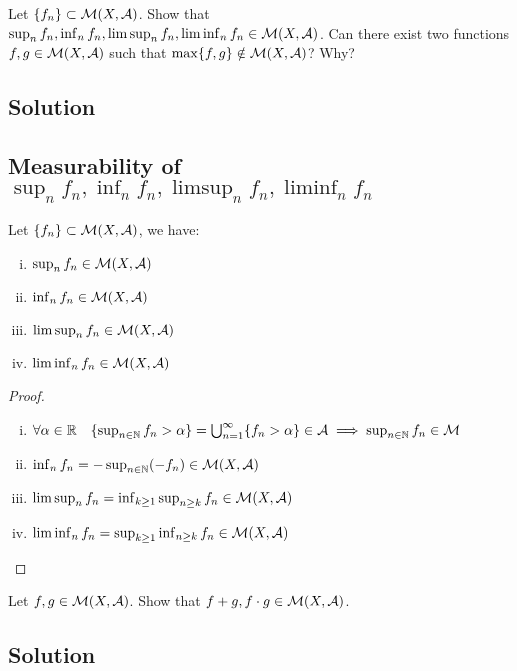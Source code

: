 
\question

Let $\{f_n\} \subset \mathcal{M}(X, \mathcal{A})$. Show that $\sup_n f_n, \inf_n f_n, \limsup_n f_n, \liminf_n f_n \in \mathcal{M}(X, \mathcal{A})$. Can there exist two functions $f, g \in \mathcal{M}(X, \mathcal{A})$ such that $\max\{f, g\} \notin \mathcal{M}(X, \mathcal{A})$? Why?

\subsection*{Solution}

\subsection{Measurability of \texorpdfstring{$\sup_n f_n, \inf_n f_n, \limsup_n f_n, \liminf_n f_n$}{sup fn, inf fn, limsup fn, liminf fn}}
Let $\{f_n\} \subset \mathcal{M}(X, \mathcal{A})$, we have:
\begin{enumerate}[i)]
    \item $\sup_n f_n \in \mathcal{M}(X, \mathcal{A})$
    \item $\inf_n f_n \in \mathcal{M}(X, \mathcal{A})$
    \item $\limsup_n f_n \in \mathcal{M}(X, \mathcal{A})$
    \item $\liminf_n f_n \in \mathcal{M}(X, \mathcal{A})$
\end{enumerate}

\begin{proof}
    \hspace*{\fill} %
    \begin{enumerate} [i)]
        \item $\forall \alpha \in \mathbb{R} \quad \{ \sup_{n\in\mathbb{N}} f_n > \alpha \} = \bigcup_{n=1}^\infty \{ f_n > \alpha \} \in \mathcal{A} \implies \sup_{n\in\mathbb{N}} f_n \in \mathcal{M}$
        \item $\inf_n f_n = - \sup_{n\in\mathbb{N}} (-f_n) \in \mathcal{M}(X,\mathcal{A})$
        \item $\limsup_n f_n = \inf_{k\geq 1} \sup_{n \geq k} f_n \in \mathcal{M}(X, \mathcal{A})$
        \item $\liminf_n f_n = \sup_{k\geq 1} \inf_{n\geq k} f_n \in \mathcal{M}(X, \mathcal{A})$
    \end{enumerate}
\end{proof}


\question

Let $f, g \in \mathcal{M}(X, \mathcal{A})$. Show that $f + g, f\cdot g \in \mathcal{M}(X, \mathcal{A})$.

\subsection*{Solution}

